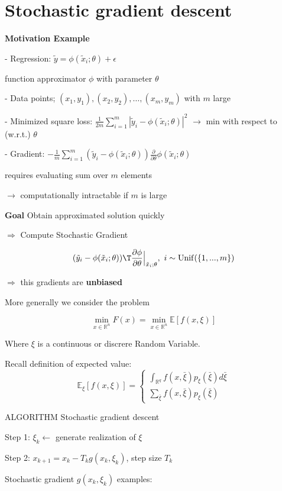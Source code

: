 \section{Stochastic gradient descent}

\textbf{Motivation Example}

- Regression: $\tilde{y}=\phi(\tilde{x}_i;\theta) + \epsilon$

function approximator $\phi$ with parameter $\theta$

- Data points; $(x_1,y_1),(x_2,y_2),\dots,(x_m,y_m)$
with $m$ large

- Minimized square loss:
$\frac{1}{2m}\sum_{i=1}^{m}
	|\tilde{y}_i-\phi(\tilde{x}_i;\theta)|^2$
$\rightarrow$ min with respect to (w.r.t.) $\theta$

- Gradient:
$-\frac{1}{m}\sum_{i=1}^{m}
	(\tilde{y}_i-\phi(\tilde{x}_i;\theta))
	\frac{\partial}{\partial\theta}
	\phi(\tilde{x}_i;\theta)$

requires evaluating sum over $m$ elements

$\rightarrow$ computationally intractable if $m$ is large

\textbf{Goal}
Obtain approximated solution quickly

$\Rightarrow$ Compute Stochastic Gradient

$$(\tilde{y}_i - \phi(\tilde{x}_i;\theta))\T
	\frac{\partial\phi}{\partial\theta}\Big|_{\tilde{x}_i;\theta}
	,\ i \sim \operatorname{Unif}(\{1,...,m\})$$


$\Rightarrow$ this gradients are \textbf{unbiased}

More generally we consider the problem

$$\min _{x \in \mathbb{R}^{n}} F(x)
	= \min _{x \in \mathbb{R}^{n}} \mathbb{E} [f(x,\xi)]$$

Where $\xi$ is a continuous or discrere Random Variable.

Recall definition of expected value:
$$
	\mathbb{E}_\xi[f(x,\xi)]=
	\begin{cases}
		\int_{\mathbb{R}^{q}}f(x,\bar{\xi})p_\xi(\bar\xi)d\bar{\xi} \\
		\sum_{\bar{\xi}}f(x,\bar{\xi})p_\xi(\bar\xi)
	\end{cases}
$$

ALGORITHM Stochastic gradient descent

Step 1: $\xi_k \leftarrow$ generate realization of $\xi$

Step 2: $x_{k+1} = x_k - T_k  g(x_k,\xi_k)$, step size $T_k$

Stochastic gradient $g(x_k,\xi_k)$ examples:


